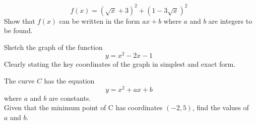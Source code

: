 \documentclass[11pt]{exam}
\newcommand{\sol}[1]{\color{gray}\fillwithlines{#1}\color{black}}
\begin{document}

\newpage 
\begin{questions}
\addpoints
\question
{}
\sol{\fill}

\question[3]
	\[ f(x) = (\sqrt{x}+3)^2 + (1-3\sqrt{x})^2 \]
	Show that $f(x)$ can be written in the form $ax + b$ where $a$ and $b$ are integers 	to be found. 
\sol{2.5 in}

\newpage 
\addpoints

\question [5]
	Sketch the graph of the function
	\[
	y = x^2 -2x - 1
	\]
	Clearly stating the key coordinates of the graph in simplest and exact form.
\sol{3in}
\vfill

\newpage 
\addpoints

\question[4]
	The curve $C$ has the equation 
    \[y = x^2 + ax + b\]
    where $a$ and $b$ are constants. \\
    Given that the minimum point of C has coordinates $(-2,5)$, find the values of $a$ 		and $b$.
\sol{2.5 in}

\question
{}
\end{questions}
\end{document}
